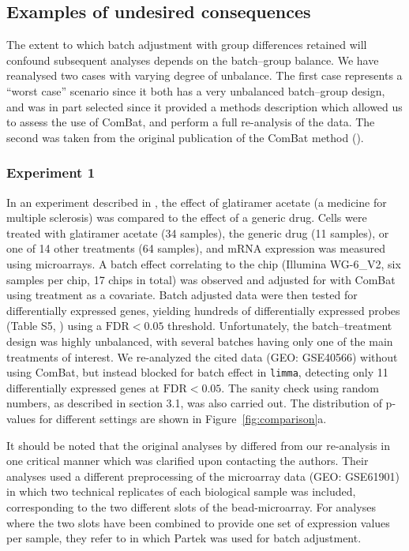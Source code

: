 \documentclass{bio}
\begin{document}
\subsection{Examples of undesired consequences}

The extent to which batch adjustment with group differences retained will confound subsequent analyses depends on the batch--group balance. We have reanalysed two cases with varying degree of unbalance. The first case represents a ``worst case'' scenario since it both has a very unbalanced batch--group design, and was in part selected since it provided a methods description which allowed us to assess the use of ComBat, and perform a full re-analysis of the data. The second was taken from the original publication of the ComBat method (\citealp{Johnson2007}).

\subsubsection{Experiment 1}

In an experiment described in \citet{Towfic2014}, the effect of glatiramer acetate (a medicine for multiple sclerosis) was compared to the effect of a generic drug. Cells were treated with glatiramer acetate (34 samples), the generic drug (11 samples), or one of 14 other treatments (64 samples), and mRNA expression was measured using microarrays. A batch effect correlating to the chip (Illumina WG-6\_V2, six samples per chip, 17 chips in total) was observed and adjusted for with ComBat using treatment as a covariate. Batch adjusted data were then tested for differentially expressed genes, yielding hundreds of differentially expressed probes (Table S5, \citealp{Towfic2014}) using a $\text{FDR}<0.05$ threshold. Unfortunately, the batch--treatment design was highly unbalanced, with several batches having only one of the main treatments of interest. We re-analyzed the cited data (GEO: GSE40566) without using ComBat, but instead blocked for batch effect in \texttt{limma}, detecting only 11 differentially expressed genes at $\text{FDR}<0.05$. The sanity check using random numbers, as described in section 3.1, was also carried out. The distribution of p-values for different settings are shown in Figure~\ref{fig:comparison}a.

It should be noted that the original analyses by \citet{Towfic2014} differed from our re-analysis in one critical manner which was clarified upon contacting the authors. Their analyses used a different preprocessing of the microarray data (GEO: GSE61901) in which two technical replicates of each biological sample was included, corresponding to the two different slots of the bead-microarray. For analyses where the two slots have been combined to provide one set of expression values per sample, they refer to \citet{Bakshi2013} in which Partek was used for batch adjustment.
\end{document}
